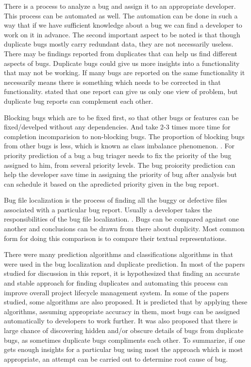 \documentclass[]{sig-alternate-05-2015}
\begin{document}
There is a process to analyze a bug and assign it to an appropriate developer. This process can be automated as well. The automation can be done in such a way that if we have sufficient knowledge about a bug we can find a developer to work on it in advance. The second important aspect to be noted is that though duplicate bugs mostly carry redundant data, they are not necessarily useless. There may be findings reported from duplicates that can help us find different aspects of bugs. Duplicate bugs could give us more insights into a functionality that may not be working. If many bugs are reported on the same functionality it necessarily means there is something which needs to be corrected in that functionality. \cite{Bettenberg} stated that one report can give us only one view of problem, but duplicate bug reports can complement each other. \newline

Blocking bugs which are to be fixed first, so that other bugs or features can be fixed/develped without any dependencies. And take 2-3 times more time for completion incomparision to non-blocking bugs. The proportion of blocking bugs from other bugs is less, which is known as class imbalance phenomenon. \cite{Tian2013}. For priority prediction of a bug a bug triager needs to fix the priority of the bug assigned to him, from several priority levels. The bug proiority prediction can help the developer save time in assigning the priority of bug after analysis but can schedule it based on the apredicted priority given in the bug report. \newline

Bug file localization is the process of finding all the buggy or defective files associated with a particular bug report. Usually a developer takes the responsibilities of the bug file localization. \cite{Nguyen}. Bugs can be compared against one another and
conclusions can be drawn from there about duplicity. Most
common form for doing this comparison is to compare their
textual representations.\newline

There were many prediction algorithms and classifications algorithms in that were used in the bug localization and duplicate prediction. In most of the papers studied for discussion in this report, it is hypothesized that finding an accurate and stable approach for finding duplicates and automating this process can improve overall project lifecycle management system. In some of the papers studied, some algorithms are also proposed. It is predicted that by applying these algorithms, assuming appropriate accuracy in them, most bugs can be assigned automatically to developers to work further. It was also proposed that there is large chance of discovering hidden and/or obscure details of bugs from duplicate bugs, as sometimes duplicate bugs compliments each other. To summarize, if one gets enough insights for a particular bug using most the approach which is most appropriate, an attempt can be carried out to determine root cause of bug. \newline
\end{document}
